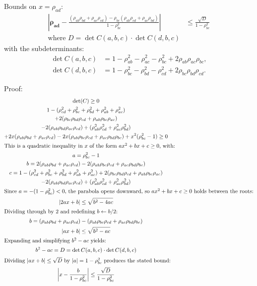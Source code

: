 \documentclass[a4paper]{article}
\begin{document}
\begin{theorem} \label{spd:four} 
Bounds on $x=\rho_{ad}$:
\begin{equation}
\boxed{
\begin{aligned}
\left|\mathbf{\rho_{ad}} - \frac{(\rho_{ab}\rho_{bd} + \rho_{ac}\rho_{cd}) - \rho_{bc}(\rho_{ab}\rho_{cd} + \rho_{ac}\rho_{bd})}{1 - \rho_{bc}^2} \right| &\leq \frac{\sqrt{D}}{1 - \rho_{bc}^2} \\[1ex]
\text{where } D = \det C(a, b, c) \cdot \det C(d, b, c) &
\end{aligned}
}
\end{equation}
with the subdeterminants:
\begin{align*}
\det C(a, b, c) &= 1 - \rho_{ab}^2 - \rho_{ac}^2 - \rho_{bc}^2 + 2\rho_{ab}\rho_{ac}\rho_{bc}, \\
\det C(d, b, c) &= 1 - \rho_{bc}^2 - \rho_{bd}^2 - \rho_{cd}^2 + 2\rho_{bc}\rho_{bd}\rho_{cd}.
\end{align*}
   
Proof:
\begin{gather*}
\det(C) \geq 0 
\\
1 - (\rho_{cd}^2 + \rho_{bc}^2 + \rho_{bd}^2 + \rho_{ab}^2 + \rho_{ac}^2) 
\\
+ 2(\rho_{bc}\rho_{bd}\rho_{cd} + \rho_{ab}\rho_{bc}\rho_{ac}) 
\\
- 2(\rho_{ab}\rho_{bd}\rho_{ac}\rho_{cd}) + (\rho_{ab}^2\rho_{cd}^2 + \rho_{ac}^2\rho_{bd}^2)
\\
+ 2x(\rho_{ab}\rho_{bd} + \rho_{ac}\rho_{cd}) - 2x(\rho_{ab}\rho_{bc}\rho_{cd} + \rho_{ac}\rho_{bd}\rho_{bc}) + x^2(\rho_{bc}^2 - 1) \geq 0
\\
\shortintertext{This is a quadratic inequality in $x$ of the form $ax^2 + bx + c \geq 0$, with:}
a = \rho_{bc}^2 - 1 
\\
b = 2(\rho_{ab}\rho_{bd} + \rho_{ac}\rho_{cd}) - 2(\rho_{ab}\rho_{bc}\rho_{cd} + \rho_{ac}\rho_{bd}\rho_{bc}) 
\\
c = 1 - (\rho_{cd}^2 + \rho_{bc}^2 + \rho_{bd}^2 + \rho_{ab}^2 + \rho_{ac}^2) + 2(\rho_{bc}\rho_{bd}\rho_{cd} + \rho_{ab}\rho_{bc}\rho_{ac}) \\
- 2(\rho_{ab}\rho_{bd}\rho_{ac}\rho_{cd}) + (\rho_{ab}^2\rho_{cd}^2 + \rho_{ac}^2\rho_{bd}^2)
\\
\shortintertext{Since $a = -(1 - \rho_{bc}^2) < 0$, the parabola opens downward, so $ax^2 + bx + c \geq 0$ holds between the roots:}
|2ax + b| \leq \sqrt{b^2 - 4ac}
\\
\shortintertext{Dividing through by $2$ and redefining $b \leftarrow b/2$:}
b = (\rho_{ab}\rho_{bd} + \rho_{ac}\rho_{cd}) - (\rho_{ab}\rho_{bc}\rho_{cd} + \rho_{ac}\rho_{bd}\rho_{bc})
\\
|ax + b| \leq \sqrt{b^2 - ac}
\\
\shortintertext{Expanding and simplifying $b^2 - ac$ yields:}
b^2 - ac = D = \det C(a, b, c) \cdot \det C(d, b, c)
\\
\shortintertext{Dividing $|ax + b| \leq \sqrt{D}$ by $|a| = 1 - \rho_{bc}^2$ produces the stated bound:}
\left| x - \frac{b}{1 - \rho_{bc}^2} \right| \leq \frac{\sqrt{D}}{1 - \rho_{bc}^2}
\end{gather*}
\end{theorem}
\end{document}
